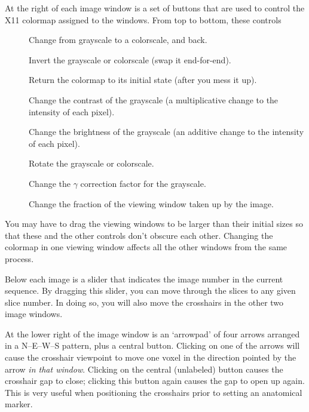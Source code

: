 At the right of each image window is a set of buttons that are used
to control the X11 colormap assigned to the windows.  From top to
bottom, these controls
\begin{description}
  \item[\blob{}]  Change from grayscale to a colorscale, and back.
  \item[\blob{}]  Invert the grayscale or colorscale (swap it end-for-end).
  \item[\blob{}]  Return the colormap to its initial state (after you
               mess it up).
  \item[\blob{}]    Change the contrast of the grayscale (a multiplicative
               change to the intensity of each pixel).
  \item[\blob{}]    Change the brightness of the grayscale (an additive change
               to the intensity of each pixel).
  \item[\blob{}]    Rotate the grayscale or colorscale.
  \item[\blob{}]    Change the $\gamma$ correction factor for the grayscale.
  \item[\blob{}]    Change the fraction of the viewing window taken up
                            by the image.
\end{description}
You may have to drag
the viewing windows to be larger than their initial
sizes so that these and the other controls don't obscure each other.
Changing the colormap in one viewing window affects all the
other windows from the same \afnit process.

Below each image is a slider that indicates the image number in the
current sequence.  By dragging this slider, you can move through the
slices to any given slice number.  In doing so, you will also move the
crosshairs in the other two image windows.

At the lower right of the image window is an `arrowpad' of four arrows
arranged in a N--E--W--S pattern, plus a central button.  Clicking
on one of the arrows will cause the crosshair viewpoint to move one
voxel in the direction pointed by the arrow {\it in that window}.
Clicking on the central (unlabeled) button causes the crosshair gap
to close;  clicking this button again causes the gap to open up again.
This is very useful when positioning the crosshairs prior to setting
an anatomical marker.

\vspace{1ex}

